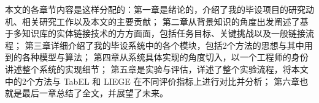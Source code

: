 本文的各章节内容是这样分配的：第一章是绪论的，介绍了我的毕设项目的研究动机、相关研究工作以及本文的主要贡献；
第二章从背景知识的角度出发阐述了基于多知识库的实体链接技术的方方面面，包括任务目标、关键挑战以及一般链接流程；
第三章详细介绍了我的毕设系统中的各个模块，包括2个方法的思想与其中用到的各种模型与算法；
第四章从系统具体实现的角度切入，以一个工程师的身份讲述整个系统的实现细节；
第五章是实验与评估，详述了整个实验流程，将本文中的2个方法与 TabEL\cite{bhagavatula2015tabel} 和 LIEGE\cite{shen2012liege} 在不同评价指标上进行对比并分析；
第六章也就是最后一章总结了全文，并展望了未来。












